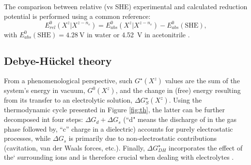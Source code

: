 \documentclass[review,preprint]{elsarticle}
\begin{document}
The comparison between relative (vs SHE) experimental and calculated reduction potential is performed using a common reference:\begin{equation}
	E^0_{rel}(X^z|X^{z-n_e})  = E^0_{abs}(X^z|X^{z-n_e}) - E^{0}_{abs}(\text{SHE}), \label{eq:ecalc}
\end{equation}
with $E^0_{abs}(\text{SHE}) = \SI{4.28}{\volt}$ in water or \SI{4.52}{\volt} in acetonitrile \cite{marenichComputationalElectrochemistryPrediction2014}.


\subsection{Debye-Hückel theory}

From a phenomenological perspective, such $G^\star(X^z)$ values are the sum of the system's energy in vacuum, $G^0(X^z)$, and the change in (free) energy resulting from its transfer to an electrolytic solution, $\Delta G_S^\star(X^z)$. Using the thermodynamic cycle presented in Figure \ref{fig:th}, the latter can be further decomposed int four steps: $\Delta G_d + \Delta G_s$ (``d" means the discharge of in the gas phase followed by,  ``c'' charge in a dielectric) accounts for purely electrostatic processes, while $\Delta G_s$ is primarily due to non-electrostatic contributions (cavitation, van der Waals forces, etc.). Finally, $\Delta G^\star_{DH}$ incorporates the effect of the` surrounding ions and is therefore crucial when dealing with electrolytes \cite{silvaImprovingBornEquation2024}.
\end{document}
